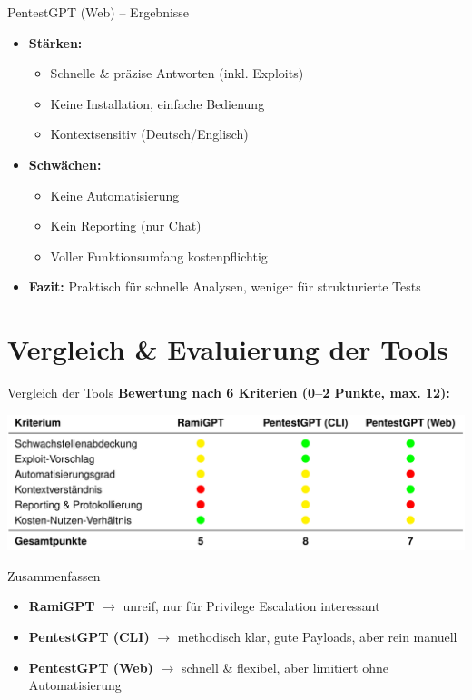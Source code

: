 \documentclass[
	aspectratio=169,	%
	onlytextwidth,		%
	t,					%
	]{beamer}
\begin{document}
\begin{frame}{PentestGPT (Web) – Ergebnisse}
	\begin{itemize}
		\item \textbf{Stärken:}
		\begin{itemize}
			\item Schnelle \& präzise Antworten (inkl. Exploits)
			\item Keine Installation, einfache Bedienung
			\item Kontextsensitiv (Deutsch/Englisch)
		\end{itemize}
		
		\item \textbf{Schwächen:}
		\begin{itemize}
			\item Keine Automatisierung
			\item Kein Reporting (nur Chat)
			\item Voller Funktionsumfang kostenpflichtig
		\end{itemize}
		
		\item \textbf{Fazit:}  
		Praktisch für schnelle Analysen, weniger für strukturierte Tests
	\end{itemize}
\end{frame}



\section{Vergleich \& Evaluierung der Tools}
\begin{frame}{Vergleich der Tools}
	\centering
	\textbf{Bewertung nach 6 Kriterien (0–2 Punkte, max. 12):}
	
	\vspace{5mm}
	\includegraphics[width=\textwidth]{figures/20.png}
	\label{fig:20}
\end{frame}

		
\begin{frame}{Zusammenfassen}
	\begin{itemize}
		\item \textbf{RamiGPT} $\rightarrow$ unreif, nur für Privilege Escalation interessant
		\item \textbf{PentestGPT (CLI)} $\rightarrow$ methodisch klar, gute Payloads, aber rein manuell
		\item \textbf{PentestGPT (Web)} $\rightarrow$ schnell \& flexibel, aber limitiert ohne Automatisierung
	\end{itemize}
\end{frame}
\end{document}
